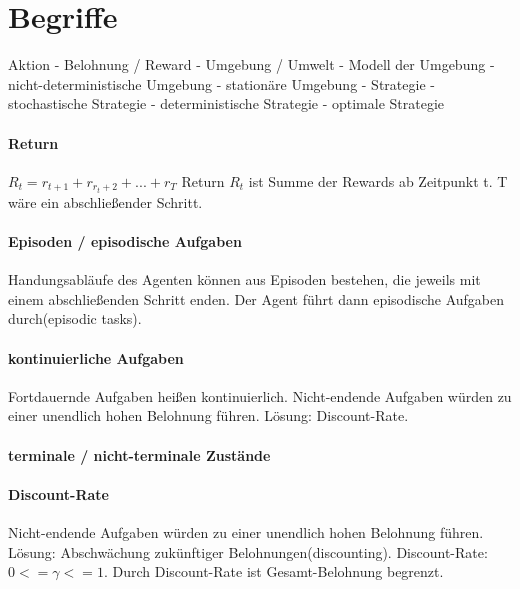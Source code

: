 \documentclass[10pt]{scrartcl}
\author{Steffen Brauer, André Harms,\\ Florian Johannßen, Jan-Christoph Meier,\\ Florian Ocker, Olaf Potratz,\\ Torben Woggan}
\title{\titletext}
\date{10.06.2012}
\begin{document}
\maketitle

\setcounter{tocdepth}{3}
\tableofcontents

	\listoffigures  
\newpage
\section{Begriffe}
Aktion
- Belohnung / Reward
- Umgebung / Umwelt
- Modell der Umgebung
- nicht-deterministische Umgebung
- stationäre Umgebung
- Strategie
- stochastische Strategie
- deterministische Strategie
- optimale Strategie
\paragraph{Return}
$R_t=r_{t+1}+r_{r_t+2}+...+r_T$
Return $R_t$ ist Summe der Rewards ab Zeitpunkt t. T wäre ein abschließender Schritt.

\paragraph{Episoden / episodische Aufgaben}
Handungsabläufe des Agenten können aus Episoden bestehen, die jeweils mit einem abschließenden Schritt enden. Der Agent führt dann episodische Aufgaben durch(episodic tasks).

\paragraph{kontinuierliche Aufgaben}
Fortdauernde Aufgaben heißen kontinuierlich. Nicht-endende Aufgaben würden zu einer unendlich hohen Belohnung führen. Lösung: Discount-Rate.

\paragraph{terminale / nicht-terminale Zustände}

\paragraph{Discount-Rate}
Nicht-endende Aufgaben würden zu einer unendlich hohen Belohnung führen. Lösung: Abschwächung zukünftiger Belohnungen(discounting). Discount-Rate: $0 <= \gamma <= 1$. Durch Discount-Rate ist Gesamt-Belohnung begrenzt.
\end{document}
